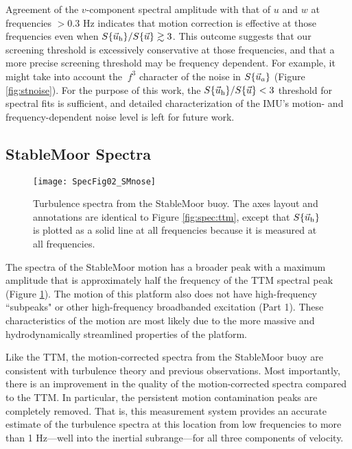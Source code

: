 Agreement of the $v$-component spectral amplitude with that of $u$ and $w$ at frequencies $>0.3$ Hz indicates that motion correction is effective at those frequencies even when $S\{\vec{u}_\mathrm{h}\}/S\{\vec{u}\} \gtrsim 3$. This outcome suggests that our screening threshold is excessively conservative at those frequencies, and that a more precise screening threshold may be frequency dependent. For example, it might take into account the $~f^3$ character of the noise in $S\{\vec{u}_a\}$ (Figure \ref{fig:stnoise}). For the purpose of this work, the $S\{\vec{u}_\mathrm{h}\}/S\{\vec{u}\} < 3$ threshold for spectral fits is sufficient, and detailed characterization of the IMU's motion- and frequency-dependent noise level is left for future work.

\subsection{StableMoor Spectra}

\begin{figure*}[th]
  \centering
  \texttt{[image: SpecFig02\_SMnose]}
  \caption{Turbulence spectra from the StableMoor buoy. The axes layout and annotations are identical to Figure \ref{fig:spec:ttm}, except that $S\{\vec{u}_\mathrm{h}\}$ is plotted as a solid line at all frequencies because it is measured at all frequencies. }
  \label{fig:spec:sm}
\end{figure*}

The spectra of the StableMoor motion has a broader peak with a maximum amplitude that is approximately half the frequency of the TTM spectral peak (Figure \ref{fig:spec:sm}). The motion of this platform also does not have high-frequency ``subpeaks" or other high-frequency broadbanded excitation (Part 1).  These characteristics of the motion are most likely due to the more massive and hydrodynamically streamlined properties of the platform. 

Like the TTM, the motion-corrected spectra from the StableMoor buoy are consistent with turbulence theory and previous observations. Most importantly, there is an improvement in the quality of the motion-corrected spectra compared to the TTM. In particular, the persistent motion contamination peaks are completely removed. That is, this measurement system provides an accurate estimate of the turbulence spectra at this location from low frequencies to more than 1 Hz---well into the inertial subrange---for all three components of velocity.

